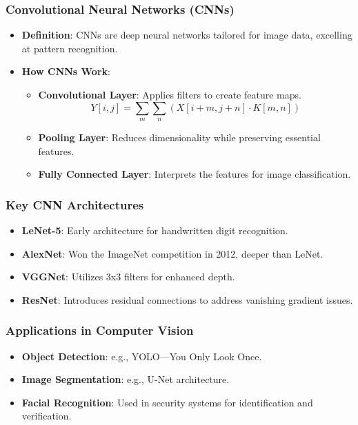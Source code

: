 \documentclass[aspectratio=169]{beamer}
\begin{document}
\begin{frame}
    \frametitle{Convolutional Neural Networks (CNNs)}
    \begin{itemize}
        \item \textbf{Definition}: CNNs are deep neural networks tailored for image data, excelling at pattern recognition.
        \item \textbf{How CNNs Work}:
        \begin{itemize}
            \item \textbf{Convolutional Layer}: Applies filters to create feature maps.
            \begin{equation}
                Y[i,j] = \sum_m \sum_n (X[i+m,j+n] \cdot K[m,n])
            \end{equation}
            \item \textbf{Pooling Layer}: Reduces dimensionality while preserving essential features.
            \item \textbf{Fully Connected Layer}: Interprets the features for image classification.
        \end{itemize}
    \end{itemize}
\end{frame}

\begin{frame}[fragile]
    \frametitle{Key CNN Architectures}
    \begin{itemize}
        \item \textbf{LeNet-5}: Early architecture for handwritten digit recognition.
        \item \textbf{AlexNet}: Won the ImageNet competition in 2012, deeper than LeNet.
        \item \textbf{VGGNet}: Utilizes 3x3 filters for enhanced depth.
        \item \textbf{ResNet}: Introduces residual connections to address vanishing gradient issues.
    \end{itemize}
\end{frame}

\begin{frame}
    \frametitle{Applications in Computer Vision}
    \begin{itemize}
        \item \textbf{Object Detection}: e.g., YOLO—You Only Look Once.
        \item \textbf{Image Segmentation}: e.g., U-Net architecture.
        \item \textbf{Facial Recognition}: Used in security systems for identification and verification.
    \end{itemize}
\end{frame}
\end{document}
